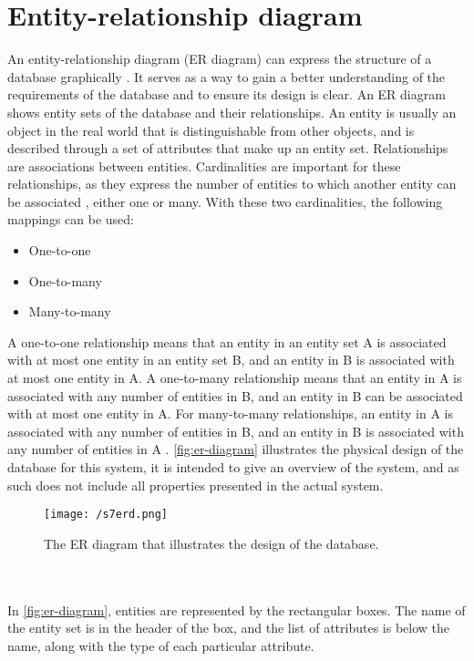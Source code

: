 \section{Entity-relationship diagram}
An entity-relationship diagram (ER diagram) can express the structure of a database graphically \cite{DBConcepts}.
It serves as a way to gain a better understanding of the requirements of the database and to ensure its design is clear.
An ER diagram shows entity sets of the database and their relationships.
An entity is usually an object in the real world that is distinguishable from other objects, and is described through a set of attributes that make up an entity set.
Relationships are associations between entities.
Cardinalities are important for these relationships, as they express the number of entities to which another entity can be associated \cite{DBConcepts}, either one or many.
With these two cardinalities, the following mappings can be used:
\begin{itemize}
    \item One-to-one
    \item One-to-many
    \item Many-to-many
\end{itemize}
A one-to-one relationship means that an entity in an entity set A is associated with at most one entity in an entity set B, and an entity in B is associated with at most one entity in A.
A one-to-many relationship means that an entity in A is associated with any number of entities in B, and an entity in B can be associated with at most one entity in A.
For many-to-many relationships, an entity in A is associated with any number of entities in B, and an entity in B is associated with any number of entities in A \cite{DBConcepts}.
\autoref{fig:er-diagram} illustrates the physical design of the database for this system, it is intended to give an overview of the system, and as such does not include all properties presented in the actual system.
\begin{sidewaysfigure}[]
    \centering
    \texttt{[image: /s7erd.png]}
    \caption{The ER diagram that illustrates the design of the database.}
    \label{fig:er-diagram}
\end{sidewaysfigure}
\\\\
In \autoref{fig:er-diagram}, entities are represented by the rectangular boxes.
The name of the entity set is in the header of the box, and the list of attributes is below the name, along with the type of each particular attribute.
